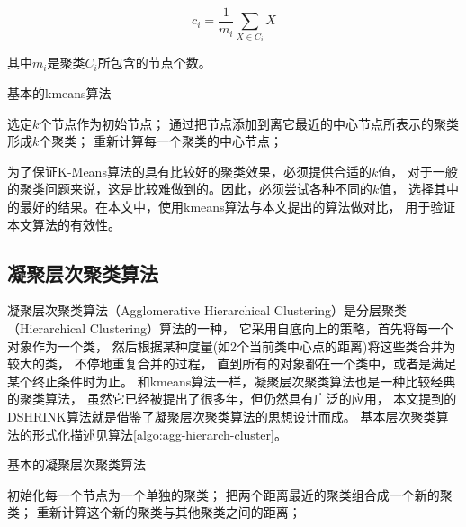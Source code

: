 \begin{equation}
    c_i = \frac{1}{m_i} \sum_{X \in C_i} X
\end{equation}

其中$m_i$是聚类$C_i$所包含的节点个数。

\begin{algorithm}[htb]
    \caption{基本的kmeans算法}
    \label{algo:kmeans}
    \begin{algorithmic}[1]
        \State 选定$k$个节点作为初始节点；
        \Repeat
            \State 通过把节点添加到离它最近的中心节点所表示的聚类形成$k$个聚类；
            \State 重新计算每一个聚类的中心节点；
    \end{algorithmic}
\end{algorithm}

为了保证K-Means算法的具有比较好的聚类效果，必须提供合适的$k$值，
对于一般的聚类问题来说，这是比较难做到的。因此，必须尝试各种不同的$k$值，
选择其中的最好的结果。在本文中，使用kmeans算法与本文提出的算法做对比，
用于验证本文算法的有效性。

\subsection{凝聚层次聚类算法}

凝聚层次聚类算法（Agglomerative Hierarchical Clustering）是分层聚类（Hierarchical Clustering）算法的一种，
它采用自底向上的策略，首先将每一个对象作为一个类，
然后根据某种度量(如2个当前类中心点的距离)将这些类合并为较大的类，
不停地重复合并的过程，
直到所有的对象都在一个类中，或者是满足某个终止条件时为止。
和kmeans算法一样，凝聚层次聚类算法也是一种比较经典的聚类算法，
虽然它已经被提出了很多年，但仍然具有广泛的应用，
本文提到的DSHRINK算法就是借鉴了凝聚层次聚类算法的思想设计而成。
基本层次聚类算法的形式化描述见算法\ref{algo:agg-hierarch-cluster}。

\begin{algorithm}[htb]
    \caption{基本的凝聚层次聚类算法}
    \label{algo:agg-hierarch-cluster}
    \begin{algorithmic}[1]
        \State 初始化每一个节点为一个单独的聚类；
        \Repeat
            \State 把两个距离最近的聚类组合成一个新的聚类；
            \State 重新计算这个新的聚类与其他聚类之间的距离；
    \end{algorithmic}
\end{algorithm}

